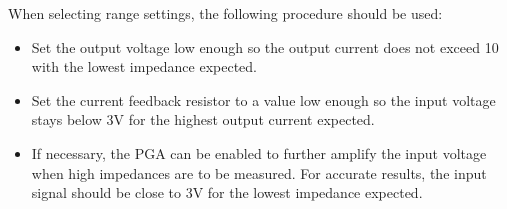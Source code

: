 When selecting range settings, the following procedure should be used:
\begin{itemize}
	\item Set the output voltage low enough so the output current does not exceed \unit{10}{\milli\ampere} with the
    lowest impedance expected.
  \item Set the current feedback resistor to a value low enough so the input voltage stays below 3V for the highest
    output current expected.
  \item If necessary, the PGA can be enabled to further amplify the input voltage when high impedances are to be
    measured. For accurate results, the input signal should be close to 3V for the lowest impedance expected.
\end{itemize}


